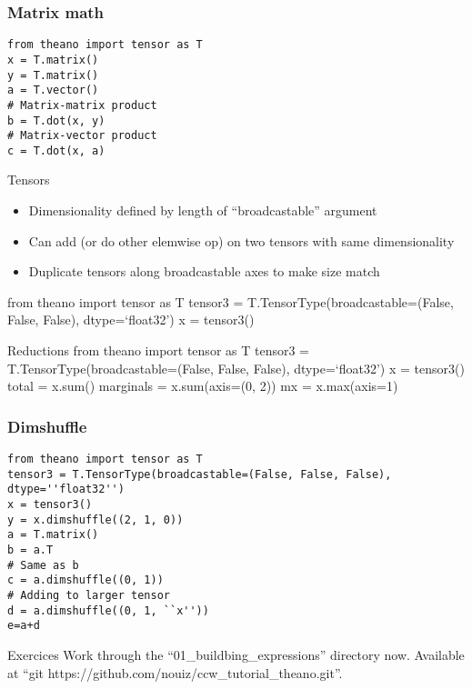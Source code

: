 \documentclass[utf8x,xcolor=pdftex,dvipsnames,table]{beamer}
\begin{document}
\begin{frame}[fragile]
  \frametitle{Matrix math}

\begin{lstlisting}
from theano import tensor as T
x = T.matrix()
y = T.matrix()
a = T.vector()
# Matrix-matrix product
b = T.dot(x, y)
# Matrix-vector product
c = T.dot(x, a)
\end{lstlisting}
\end{frame}

\begin{frame}{Tensors}
  \begin{itemize}
  \item Dimensionality defined by length of “broadcastable” argument

  \item Can add (or do other elemwise op) on two
    tensors with same dimensionality
  \item Duplicate tensors along broadcastable axes to
    make size match
  \end{itemize}
from theano import tensor as T
tensor3 =
T.TensorType(broadcastable=(False, False,
False), dtype=‘float32’)
x = tensor3()
\end{frame}

\begin{frame}{Reductions}
from theano import tensor as T
tensor3 =
T.TensorType(broadcastable=(False,
False, False), dtype=‘float32’)
x = tensor3()
total = x.sum()
marginals = x.sum(axis=(0, 2))
mx = x.max(axis=1)
\end{frame}

\begin{frame}[fragile]
  \frametitle{Dimshuffle}

\begin{lstlisting}
from theano import tensor as T
tensor3 = T.TensorType(broadcastable=(False, False, False), dtype=''float32'')
x = tensor3()
y = x.dimshuffle((2, 1, 0))
a = T.matrix()
b = a.T
# Same as b
c = a.dimshuffle((0, 1))
# Adding to larger tensor
d = a.dimshuffle((0, 1, ``x''))
e=a+d
\end{lstlisting}
\end{frame}

\begin{frame}{Exercices}
  Work through the ``01\_buildbing\_expressions'' directory now.
  Available at ``git https://github.com/nouiz/ccw\_tutorial\_theano.git''.
\end{frame}
\end{document}
